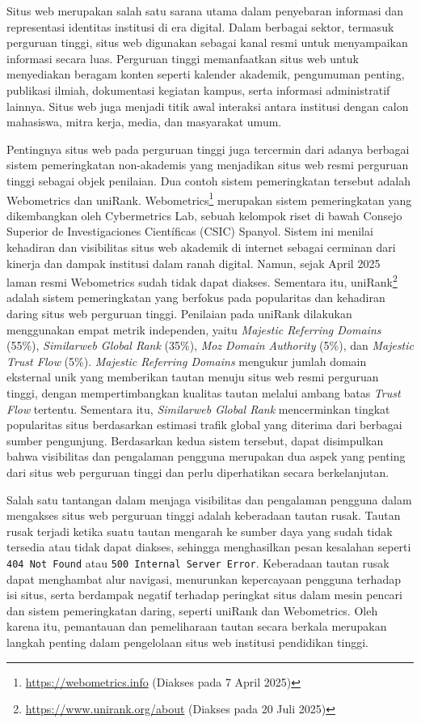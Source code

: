 Situs web merupakan salah satu sarana utama dalam penyebaran informasi dan representasi identitas institusi di era digital. Dalam berbagai sektor, termasuk perguruan tinggi, situs web digunakan sebagai kanal resmi untuk menyampaikan informasi secara luas. Perguruan tinggi memanfaatkan situs web untuk menyediakan beragam konten seperti kalender akademik, pengumuman penting, publikasi ilmiah, dokumentasi kegiatan kampus, serta informasi administratif lainnya. Situs web juga menjadi titik awal interaksi antara institusi dengan calon mahasiswa, mitra kerja, media, dan masyarakat umum.

Pentingnya situs web pada perguruan tinggi juga tercermin dari adanya berbagai sistem pemeringkatan non-akademis yang menjadikan situs web resmi perguruan tinggi sebagai objek penilaian. Dua contoh sistem pemeringkatan tersebut adalah Webometrics dan uniRank. Webometrics\footnote{\url{https://webometrics.info} (Diakses pada 7 April 2025)} merupakan sistem pemeringkatan yang dikembangkan oleh Cybermetrics Lab, sebuah kelompok riset di bawah Consejo Superior de Investigaciones Científicas (CSIC) Spanyol. Sistem ini menilai kehadiran dan visibilitas situs web akademik di internet sebagai cerminan dari kinerja dan dampak institusi dalam ranah digital. Namun, sejak April 2025 laman resmi Webometrics sudah tidak dapat diakses. Sementara itu, uniRank\footnote{\url{https://www.unirank.org/about} (Diakses pada 20 Juli 2025)} adalah sistem pemeringkatan yang berfokus pada popularitas dan kehadiran daring situs web perguruan tinggi. Penilaian pada uniRank dilakukan menggunakan empat metrik independen, yaitu \textit{Majestic Referring Domains} (55\%), \textit{Similarweb Global Rank} (35\%), \textit{Moz Domain Authority} (5\%), dan \textit{Majestic Trust Flow} (5\%). \textit{Majestic Referring Domains} mengukur jumlah domain eksternal unik yang memberikan tautan menuju situs web resmi perguruan tinggi, dengan mempertimbangkan kualitas tautan melalui ambang batas \textit{Trust Flow} tertentu. Sementara itu, \textit{Similarweb Global Rank} mencerminkan tingkat popularitas situs berdasarkan estimasi trafik global yang diterima dari berbagai sumber pengunjung. Berdasarkan kedua sistem tersebut, dapat disimpulkan bahwa visibilitas dan pengalaman pengguna merupakan dua aspek yang penting dari situs web perguruan tinggi dan perlu diperhatikan secara berkelanjutan.



Salah satu tantangan dalam menjaga visibilitas dan pengalaman pengguna dalam mengakses situs web perguruan tinggi adalah keberadaan tautan rusak. Tautan rusak terjadi ketika suatu tautan mengarah ke sumber daya yang sudah tidak tersedia atau tidak dapat diakses, sehingga menghasilkan pesan kesalahan seperti \texttt{404 Not Found} atau \texttt{500 Internal Server Error}. Keberadaan tautan rusak dapat menghambat alur navigasi, menurunkan kepercayaan pengguna terhadap isi situs, serta berdampak negatif terhadap peringkat situs dalam mesin pencari dan sistem pemeringkatan daring, seperti uniRank dan Webometrics. Oleh karena itu, pemantauan dan pemeliharaan tautan secara berkala merupakan langkah penting dalam pengelolaan situs web institusi pendidikan tinggi.


